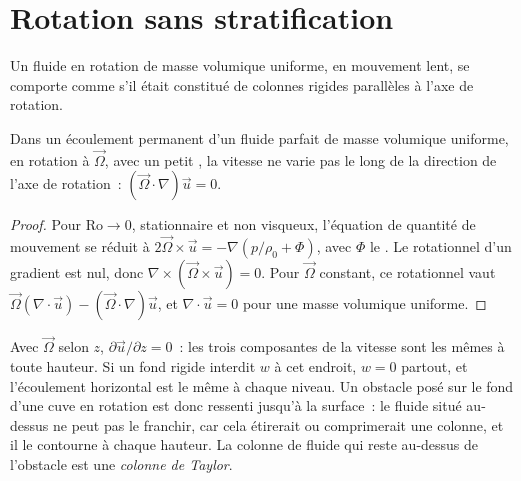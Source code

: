 \section{Rotation sans stratification}\label{sec:b3:gfd-foundations:taylor}

Un fluide en rotation de masse volumique uniforme, en mouvement lent, se comporte comme s'il était
constitué de colonnes rigides parallèles à l'axe de rotation.

\begin{theorem}\label{thm:b3:gfd-foundations:taylor-proudman}
Dans un écoulement permanent d'un fluide parfait de masse volumique uniforme, en rotation à
$\vec\Omega$, avec un petit , la vitesse ne varie pas le long de
la direction de l'axe de rotation~: $(\vec\Omega\cdot\nabla)\vec u = 0$.
\end{theorem}

\begin{proof}
Pour $\mathrm{Ro}\to 0$, stationnaire et non visqueux, l'équation de quantité de mouvement se réduit
à $2\vec\Omega\times\vec u = -\nabla(p/\rho_0 + \Phi)$, avec $\Phi$ le
. Le rotationnel d'un gradient est nul, donc $\nabla\times(\vec\Omega
\times\vec u) = 0$. Pour $\vec\Omega$ constant, ce rotationnel vaut $\vec\Omega
(\nabla\cdot\vec u) - (\vec\Omega\cdot\nabla)\vec u$, et $\nabla\cdot\vec u
= 0$ pour une masse volumique uniforme.
\end{proof}

Avec $\vec\Omega$ selon $z$, $\partial\vec u/\partial z = 0$~: les trois
composantes de la vitesse sont les mêmes à toute hauteur. Si un fond rigide interdit
$w$ à cet endroit, $w = 0$ partout, et l'écoulement horizontal est le même à chaque
niveau. Un obstacle posé sur le fond d'une cuve en rotation est donc ressenti
jusqu'à la surface~: le fluide situé au-dessus ne peut pas le franchir, car cela
étirerait ou comprimerait une colonne, et il le contourne à chaque hauteur.
La colonne de fluide qui reste au-dessus de l'obstacle est une \emph{colonne
de Taylor}.

